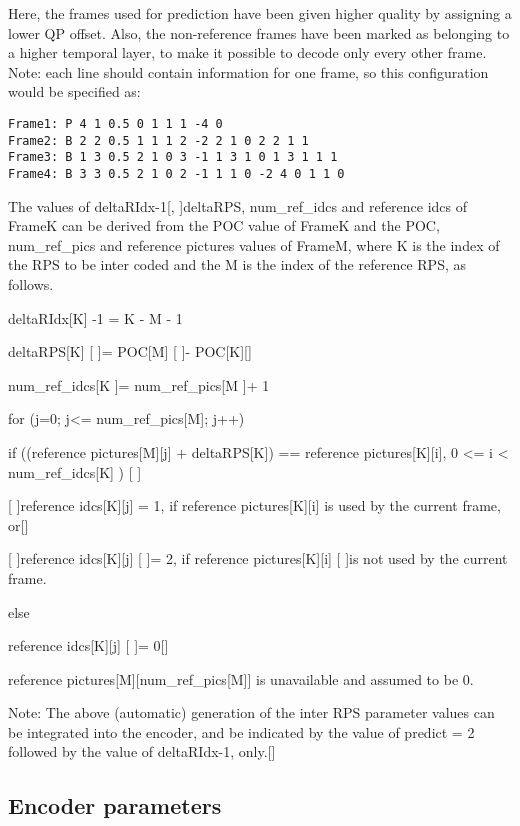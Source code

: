 \documentclass[a4paper,11pt]{jctvcdoc}
\begin{document}
Here, the frames used for prediction have been given higher
quality by assigning a lower QP offset. Also, the non-reference
frames have been marked as belonging to a higher temporal layer,
to make it possible to decode only every other frame. Note: each
line should contain information for one frame, so this
configuration would be specified as:

\begin{verbatim}
Frame1: P 4 1 0.5 0 1 1 1 -4 0
Frame2: B 2 2 0.5 1 1 1 2 -2 2 1 0 2 2 1 1
Frame3: B 1 3 0.5 2 1 0 3 -1 1 3 1 0 1 3 1 1 1
Frame4: B 3 3 0.5 2 1 0 2 -1 1 1 0 -2 4 0 1 1 0
\end{verbatim}

The values of deltaRIdx-1[, ]deltaRPS, num_ref_idcs and reference
idcs of FrameK can be derived from the POC value of FrameK and
the POC, num_ref_pics and reference pictures values of FrameM, where
K is the index of the RPS to be inter coded and the M is the
index of the reference RPS, as follows.

deltaRIdx[K] -1 = K - M - 1

deltaRPS[K] [ ]= POC[M] [ ]- POC[K][]

num_ref_idcs[K ]= num_ref_pics[M ]+ 1

for (j=0; j<= num_ref_pics[M]; j++)

{

if ((reference pictures[M][j] + deltaRPS[K]) == reference
pictures[K][i], 0 <= i < num_ref_idcs[K] ) [ ]{

[ ]reference idcs[K][j] = 1, if reference pictures[K][i] is used
by the current frame, or[]

[ ]reference idcs[K][j] [ ]= 2, if reference pictures[K][i] [ ]is
not used by the current frame.

}

else {

reference idcs[K][j] [ ]= 0[]

}

}

reference pictures[M][num_ref_pics[M]] is unavailable and assumed to
be 0.

Note: The above (automatic) generation of the inter RPS parameter
values can be integrated into the encoder, and be indicated by
the value of predict = 2 followed by the value of deltaRIdx-1,
only.[]



\subsection{Encoder parameters}
\end{document}
